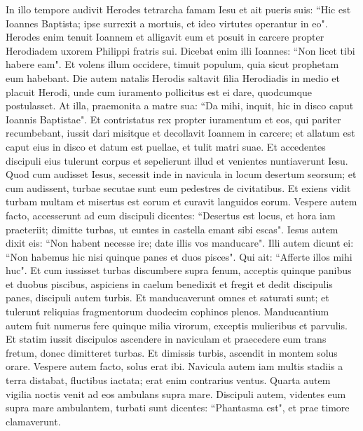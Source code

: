 \begin{biblechapter}  
\verse In illo tempore audivit Herodes tetrarcha famam Iesu 
\verse et ait pueris suis: “Hic est Ioannes Baptista; ipse surrexit a mortuis, et ideo virtutes operantur in eo". 
\verse Herodes enim tenuit Ioannem et alligavit eum et posuit in carcere propter Herodiadem uxorem Philippi fratris sui. 
\verse Dicebat enim illi Ioannes: “Non licet tibi habere eam". 
\verse Et volens illum occidere, timuit populum, quia sicut prophetam eum habebant. 
\verse Die autem natalis Herodis saltavit filia Herodiadis in medio et placuit Herodi, 
\verse unde cum iuramento pollicitus est ei dare, quodcumque postulasset.  
\verse At illa, praemonita a matre sua: “Da mihi, inquit, hic in disco caput Ioannis Baptistae". 
\verse Et contristatus rex propter iuramentum et eos, qui pariter recumbebant, iussit dari 
\verse misitque et decollavit Ioannem in carcere;  
\verse et allatum est caput eius in disco et datum est puellae, et tulit matri suae.  
\verse Et accedentes discipuli eius tulerunt corpus et sepelierunt illud et venientes nuntiaverunt Iesu. 
\verse Quod cum audisset Iesus, secessit inde in navicula in locum desertum seorsum; et cum audissent, turbae secutae sunt eum pedestres de civitatibus. 
\verse Et exiens vidit turbam multam et misertus est eorum et curavit languidos eorum.  
\verse Vespere autem facto, accesserunt ad eum discipuli dicentes: “Desertus est locus, et hora iam praeteriit; dimitte turbas, ut euntes in castella emant sibi escas". 
\verse Iesus autem dixit eis: “Non habent necesse ire; date illis vos manducare". 
\verse Illi autem dicunt ei: “Non habemus hic nisi quinque panes et duos pisces". 
\verse Qui ait: “Afferte illos mihi huc". 
\verse Et cum iussisset turbas discumbere supra fenum, acceptis quinque panibus et duobus piscibus, aspiciens in caelum benedixit et fregit et dedit discipulis panes, discipuli autem turbis. 
\verse Et manducaverunt omnes et saturati sunt; et tulerunt reliquias fragmentorum duodecim cophinos plenos. 
\verse Manducantium autem fuit numerus fere quinque milia virorum, exceptis mulieribus et parvulis. 
\verse Et statim iussit discipulos ascendere in naviculam et praecedere eum trans fretum, donec dimitteret turbas. 
\verse Et dimissis turbis, ascendit in montem solus orare. Vespere autem facto, solus erat ibi. 
\verse Navicula autem iam multis stadiis a terra distabat, fluctibus iactata; erat enim contrarius ventus. 
\verse Quarta autem vigilia noctis venit ad eos ambulans supra mare. 
\verse Discipuli autem, videntes eum supra mare ambulantem, turbati sunt dicentes: “Phantasma est", et prae timore clamaverunt. 

\end{biblechapter}
